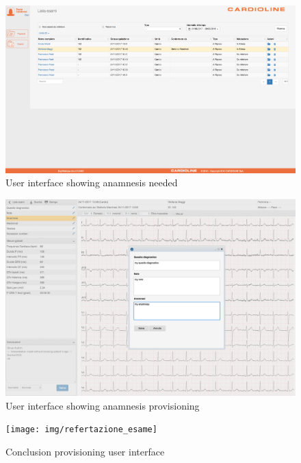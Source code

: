 \begin{figure}[h]
    \includegraphics[width=\textwidth]{img/todo_anamnesi}
    \caption{User interface showing anamnesis needed}
    \label{fig:todo_anamnesi}
\end{figure}

\begin{figure}[h]
    \includegraphics[width=\textwidth]{img/aggiunta_anamnesi}
    \caption{User interface showing anamnesis provisioning}
    \label{fig:aggiunta_anamnesi}
\end{figure}

\begin{figure}[h]
    \texttt{[image: img/refertazione\_esame]}
    \caption{Conclusion provisioning user interface}
    \label{fig:refertazione_esame}
\end{figure}



